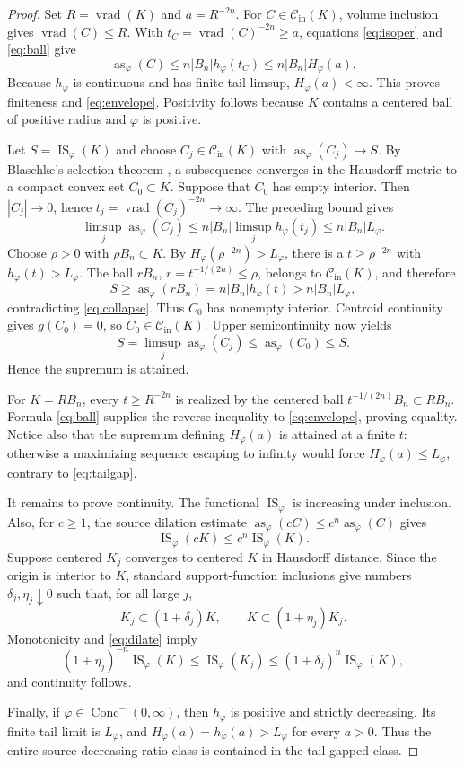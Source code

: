 \documentclass[11pt]{article}
\newcommand{\IS}{\operatorname{IS}}
\newcommand{\as}{\operatorname{as}}
\newcommand{\vrad}{\operatorname{vrad}}
\newcommand{\Cin}{\mathcal{C}_{\mathrm{in}}}
\begin{document}
\begin{proof}
Set $R=\vrad(K)$ and $a=R^{-2n}$.  For $C\in\Cin(K)$, volume inclusion gives
$\vrad(C)\le R$.  With $t_C=\vrad(C)^{-2n}\ge a$, equations
\eqref{eq:isoper} and \eqref{eq:ball} give
\[
 \as_\varphi(C)
 \le n|B_n|h_\varphi(t_C)
 \le n|B_n|H_\varphi(a).
\]
Because $h_\varphi$ is continuous and has finite tail limsup,
$H_\varphi(a)<\infty$.  This proves finiteness and
\eqref{eq:envelope}.  Positivity follows because $K$ contains a centered ball
of positive radius and $\varphi$ is positive.

Let $S=\IS_\varphi(K)$ and choose $C_j\in\Cin(K)$ with
$\as_\varphi(C_j)\to S$.  By Blaschke's selection theorem
\cite{Schneider}, a subsequence converges in the Hausdorff metric to a compact
convex set $C_0\subset K$.  Suppose that $C_0$ has empty interior.  Then
$|C_j|\to0$, hence $t_j=\vrad(C_j)^{-2n}\to\infty$.  The preceding bound
gives
\begin{equation}\label{eq:collapse}
 \limsup_j\as_\varphi(C_j)
 \le n|B_n|\limsup_j h_\varphi(t_j)
 \le n|B_n|L_\varphi.
\end{equation}
Choose $\rho>0$ with $\rho B_n\subset K$.  By
$H_\varphi(\rho^{-2n})>L_\varphi$, there is a
$t\ge\rho^{-2n}$ with $h_\varphi(t)>L_\varphi$.  The ball
$rB_n$, $r=t^{-1/(2n)}\le\rho$, belongs to $\Cin(K)$, and therefore
\[
 S\ge\as_\varphi(rB_n)
 =n|B_n|h_\varphi(t)>n|B_n|L_\varphi,
\]
contradicting \eqref{eq:collapse}.  Thus $C_0$ has nonempty interior.
Centroid continuity gives $g(C_0)=0$, so $C_0\in\Cin(K)$.  Upper
semicontinuity now yields
\[
 S=\limsup_j\as_\varphi(C_j)
 \le\as_\varphi(C_0)\le S.
\]
Hence the supremum is attained.

For $K=RB_n$, every $t\ge R^{-2n}$ is realized by the centered ball
$t^{-1/(2n)}B_n\subset RB_n$.  Formula \eqref{eq:ball} supplies the reverse
inequality to \eqref{eq:envelope}, proving equality.  Notice also that the
supremum defining $H_\varphi(a)$ is attained at a finite $t$: otherwise a
maximizing sequence escaping to infinity would force
$H_\varphi(a)\le L_\varphi$, contrary to \eqref{eq:tailgap}.

It remains to prove continuity.  The functional $\IS_\varphi$ is increasing
under inclusion.  Also, for $c\ge1$, the source dilation estimate
$\as_\varphi(cC)\le c^n\as_\varphi(C)$ gives
\begin{equation}\label{eq:dilate}
 \IS_\varphi(cK)\le c^n\IS_\varphi(K).
\end{equation}
Suppose centered $K_j$ converges to centered $K$ in Hausdorff distance.
Since the origin is interior to $K$, standard support-function inclusions give
numbers $\delta_j,\eta_j\downarrow0$ such that, for all large $j$,
\[
 K_j\subset(1+\delta_j)K,
 \qquad K\subset(1+\eta_j)K_j.
\]
Monotonicity and \eqref{eq:dilate} imply
\[
 (1+\eta_j)^{-n}\IS_\varphi(K)
 \le\IS_\varphi(K_j)
 \le(1+\delta_j)^n\IS_\varphi(K),
\]
and continuity follows.

Finally, if $\varphi\in\operatorname{Conc}^{-}(0,\infty)$, then
$h_\varphi$ is positive and strictly decreasing.  Its finite tail limit is
$L_\varphi$, and
$H_\varphi(a)=h_\varphi(a)>L_\varphi$ for every $a>0$.  Thus the entire
source decreasing-ratio class is contained in the tail-gapped class.
\end{proof}
\end{document}
